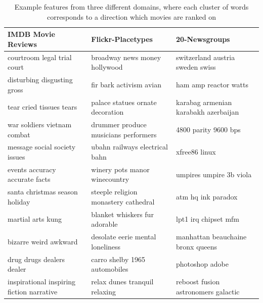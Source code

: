  
 \begin{table}[] 
 	\scriptsize
 	\begin{tabular}{lll}                                                                   
 		\textbf{IMDB Movie Reviews}                                 & \textbf{Flickr-Placetypes}           & \textbf{20-Newsgroups}                           \\
 		\toprule
 		courtroom legal trial court                                 & broadway news money hollywood        & switzerland austria sweden swiss     \\
 		disturbing disgusting gross                                 & fir bark activism avian              & ham amp reactor watts                \\
 		tear cried tissues tears                                    & palace statues ornate decoration     & karabag armenian karabakh azerbaijan \\
 		war soldiers vietnam combat                                 & drummer produce musicians performers & 4800 parity 9600 bps                 \\
 		message social society issues                               & ubahn railways electrical bahn       & xfree86 linux                        \\
 		events accuracy accurate facts                              & winery pots manor winecountry        & umpires umpire 3b viola              \\
 		santa christmas season holiday                              & steeple religion monastery cathedral & atm hq ink paradox                   \\
 		martial arts kung                                           & blanket whiskers fur adorable        & lpt1 irq chipset mfm                 \\
 		bizarre weird awkward                                       & desolate eerie mental loneliness     & manhattan beauchaine bronx queens    \\
 		drug drugs dealers dealer                                   & carro shelby 1965 automobiles        & photoshop adobe                      \\
 		inspirational inspiring fiction narrative                   & relax dunes tranquil relaxing        & reboost fusion astronomers galactic 
 	\end{tabular}  
 	\caption{Example features from three different domains, where each cluster of words corresponds to a direction which movies are ranked on}\label{ch3:ExampleRep}    
 \end{table}   
 
